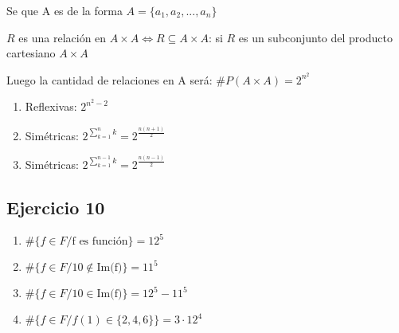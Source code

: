 Se que A es de la forma $ A = \{ a_1, a_2, ... , a_n \} $

$R$ es una relación en $ A \times A \iff R \subseteq A \times A $: si $R$ es un subconjunto del producto cartesiano $ A \times A $

Luego la cantidad de relaciones en A será: $ \# P(A \times A) = 2^{n^2}$

\begin{enumerate}
    \item Reflexivas: $ 2^{n^2-2} $
    \item Simétricas: $ 2^{\sum_{k =1}^{n}k} = 2^{\frac{n(n+1)}{2}} $
    \item Simétricas: $ 2^{\sum_{k =1}^{n-1}k} = 2^{\frac{n(n-1)}{2}} $
\end{enumerate}

\subsection{Ejercicio 10}
\begin{enumerate}
    \item $ \#\{ f \in F / \text{f es función}\} = 12^5 $
    \item $ \#\{ f \in F / 10 \not \in \text{Im(f)} \} = 11^5 $
    \item $ \#\{ f \in F / 10 \in \text{Im(f)} \} = 12^5 - 11^5 $
    \item $ \#\{ f \in F / f(1) \in \{ 2,4,6 \} \} = 3 \cdot 12^4 $
\end{enumerate}



